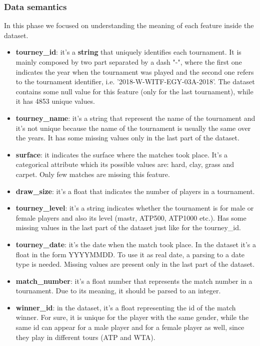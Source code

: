 \subsubsection{Data semantics}
In this phase we focused on understanding the meaning of each feature inside the dataset.
\begin{itemize}
    \item \textbf{tourney\_id}: it's a \textbf{string} that uniquely identifies each tournament. It is mainly composed by two part separated by a dash "-", where the first one indicates the year when the tournament was played and the second one refers to the tournament identifier, i.e. '2018-W-WITF-EGY-03A-2018'. The dataset contains some null value for this feature (only for the last tournament), while it has 4853 unique values.
    \item \textbf{tourney\_name}: it's a string that represent the name of the tournament and it's not unique because the name of the tournament is usually the same over the years. It has some missing values only in the last part of the dataset.
    \item \textbf{surface}: it indicates the surface where the matches took place. It's a categorical attribute which its possible values are: hard, clay, grass and carpet. Only few matches are missing this feature.
    \item \textbf{draw\_size}: it's a float that indicates the number of players in a tournament.
    \item \textbf{tourney\_level}: it's a string indicates whether the tournament is for male or female players and also its level (mastr, ATP500, ATP1000 etc.). Has some missing values in the last part of the dataset just like for the tourney\_id.
    \item \textbf{tourney\_date}: it's the date when the match took place. In the dataset it's a float in the form YYYYMMDD. To use it as real date, a parsing to a date type is needed. Missing values are present only in the last part of the dataset.
    \item \textbf{match\_number}: it's a float number that represents the match number in a tournament. Due to its meaning, it should be parsed to an integer.
    \item \textbf{winner\_id}: in the dataset, it's a float representing the id of the match winner. For sure, it is unique for the player with the same gender, while the same id can appear for a male player and for a female player as well, since they play in different tours (ATP and WTA).

\end{itemize}
